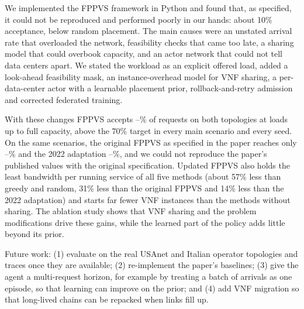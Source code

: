 We implemented the FPPVS framework in Python and found that, as specified, it
could not be reproduced and performed poorly in our hands: about 10\%
acceptance, below random placement. The main causes were an unstated arrival
rate that overloaded the network, feasibility checks that came too late, a
sharing model that could overbook capacity, and an actor network that could not
tell data centers apart. We stated the workload as an explicit offered load,
added a look-ahead feasibility mask, an instance-overhead model for VNF sharing,
a per-data-center actor with a learnable placement prior, rollback-and-retry
admission and corrected federated training.

With these changes FPPVS accepts \fppvsMinAcc--\fppvsMaxAcc\% of requests on
both topologies at loads up to full capacity, above the 70\% target in every
main scenario and every seed. On the same scenarios, the original FPPVS as
specified in the paper reaches only \origMinAcc--\origMaxAcc\% and the 2022
adaptation \zhangMinAcc--\zhangMaxAcc\%, and we could not reproduce the paper's
published values with the original specification. Updated FPPVS also holds the
least bandwidth per running service of all five methods (about 57\% less than
greedy and random, 31\% less than the original FPPVS and 14\% less than the 2022
adaptation) and starts far fewer VNF instances than the methods without sharing.
The ablation study shows that VNF sharing and the problem
modifications drive these gains, while the learned part of the policy adds
little beyond its prior.

Future work: (1) evaluate on the real USAnet and Italian operator topologies and
traces once they are available; (2) re-implement the paper's baselines; (3) give
the agent a multi-request horizon, for example by treating a batch of arrivals
as one episode, so that learning can improve on the prior; and (4) add VNF
migration so that long-lived chains can be repacked when links fill up.
